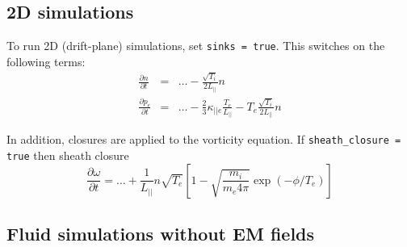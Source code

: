 \documentclass[12pt,a4paper]{article}
\newcommand{\deriv}[2]{\frac{\partial #1}{\partial #2}}
\begin{document}
\subsection{2D simulations}

To run 2D (drift-plane) simulations, set \texttt{sinks = true}. This 
switches on the following terms:
\begin{eqnarray}
  \deriv{n}{t} &=& \ldots - \frac{\sqrt{T_i}}{2L_{||}}n \\
  \deriv{p_e}{t} &=& \ldots - \frac{2}{3}\kappa_{||e} \frac{T_e}{L_{||}} - T_e \frac{\sqrt{T_i}}{2L_{||}}n
\end{eqnarray}

In addition, closures are applied to the vorticity equation. If \texttt{sheath\_closure = true} then sheath closure
\[
\deriv{\omega}{t} = \ldots + \frac{1}{L_{||}} n\sqrt{T_e}\left[1 - \sqrt{\frac{m_i}{m_e4\pi}}\exp\left(-\phi/T_e\right)\right]
\]


\subsection{Fluid simulations without EM fields}
\end{document}
